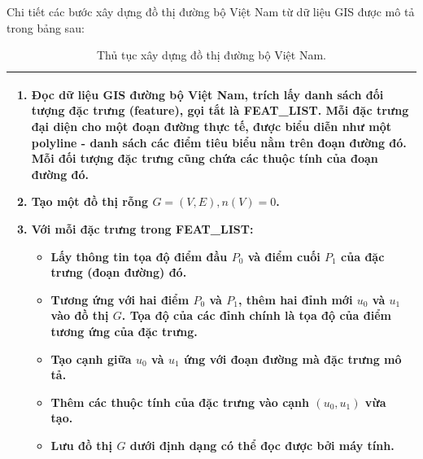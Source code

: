 \documentclass[14pt, oneside, a4paper, openany]{scrartcl}
\begin{document}
Chi tiết các bước xây dựng đồ thị đường bộ Việt Nam từ dữ liệu GIS được mô tả trong bảng sau:
%
\begin{table}[!h]
	\caption[Thủ tục xây dựng đồ thị đường bộ Việt Nam.]{Thủ tục xây dựng đồ thị đường bộ Việt Nam.}
	\begin{tabular}{ |m{15cm}| } 
		\hline
		\begin{enumerate}
			\item Đọc dữ liệu GIS đường bộ Việt Nam, trích lấy danh sách đối tượng đặc trưng (feature), gọi tắt là \textbf{FEAT\_LIST}. Mỗi đặc trưng đại diện cho một đoạn đường thực tế, được biểu diễn như một polyline - danh sách các điểm tiêu biểu nằm trên đoạn đường đó. Mỗi đối tượng đặc trưng cũng chứa các thuộc tính của đoạn đường đó.
			\item Tạo một đồ thị rỗng $G = (V,E), n(V) = 0$.
			\item Với mỗi đặc trưng trong \textbf{FEAT\_LIST}:
			\begin{itemize}
				\item Lấy thông tin tọa độ điểm đầu $P_0$ và điểm cuối $P_1$ của đặc trưng (đoạn đường) đó.
				\item Tương ứng với hai điểm $P_0$ và $P_1$, thêm hai đỉnh mới $u_0$ và $u_1$ vào đồ thị $G$. Tọa độ của các đỉnh chính là tọa độ của điểm tương ứng của đặc trưng.
				\item Tạo cạnh giữa $u_0$ và $u_1$ ứng với đoạn đường mà đặc trưng mô tả.
				\item Thêm các thuộc tính của đặc trưng vào cạnh $(u_0,u_1)$ vừa tạo.
			\item Lưu đồ thị $G$ dưới định dạng có thể đọc được bởi máy tính.
			\end{itemize}
		\end{enumerate}
		\\
		\hline
	\end{tabular}
	\label{table:graphcreation}
\end{table}
\end{document}
